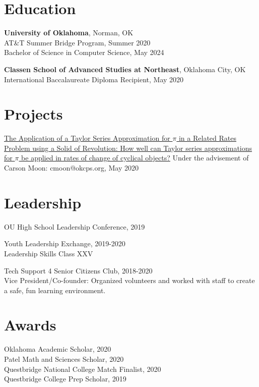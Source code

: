 \documentclass[12pt]{article}
\begin{document}
\section*{Education}
\textbf{University of Oklahoma}, Norman, OK \\
AT\&T Summer Bridge Program, Summer 2020 \\
Bachelor of Science in Computer Science, May 2024

\textbf{Classen School of Advanced Studies at Northeast}, Oklahoma City, OK \\
International Baccalaureate Diploma Recipient, May 2020

\section*{Projects}
\href{https://github.com/tttnguyen729/ee}{The Application of a Taylor Series Approximation for \(\pi\) in a Related Rates Problem using a Solid of Revolution: How well can Taylor series approximations for \(\pi\) be applied in rates of change of cyclical objects?} Under the advisement of Carson Moon: cmoon@okcps.org, May 2020 

\section*{Leadership}
OU High School Leadership Conference, 2019

Youth Leadership Exchange, 2019-2020 \\ 
\indent Leadership Skills Class XXV

Tech Support 4 Senior Citizens Club, 2018-2020 \\
Vice President/Co-founder: Organized volunteers and worked with staff to create a safe, fun learning environment.

\section*{Awards}
Oklahoma Academic Scholar, 2020 \\
Patel Math and Sciences Scholar, 2020 \\
Questbridge National College Match Finalist, 2020 \\
Questbridge College Prep Scholar, 2019

%
\end{document}

